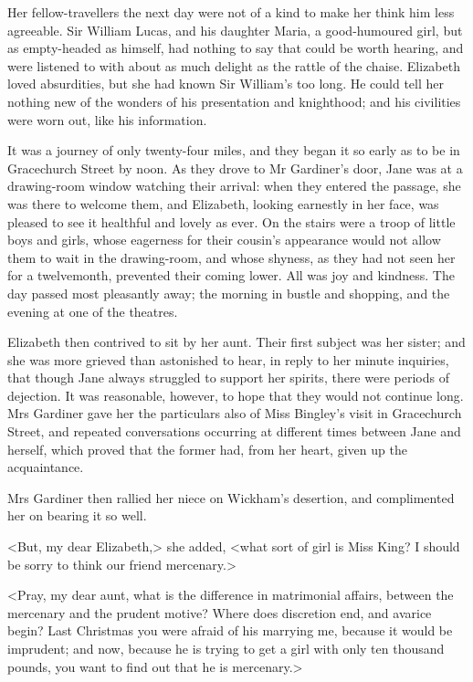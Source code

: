 Her fellow-travellers the next day were not of a kind to make her think him less agreeable. Sir William Lucas, and his daughter Maria, a good-humoured girl, but as empty-headed as himself, had nothing to say that could be worth hearing, and were listened to with about as much delight as the rattle of the chaise. Elizabeth loved absurdities, but she had known Sir William's too long. He could tell her nothing new of the wonders of his presentation and knighthood; and his civilities were worn out, like his information.

It was a journey of only twenty-four miles, and they began it so early as to be in Gracechurch Street by noon. As they drove to Mr Gardiner's door, Jane was at a drawing-room window watching their arrival: when they entered the passage, she was there to welcome them, and Elizabeth, looking earnestly in her face, was pleased to see it healthful and lovely as ever. On the stairs were a troop of little boys and girls, whose eagerness for their cousin's appearance would not allow them to wait in the drawing-room, and whose shyness, as they had not seen her for a twelvemonth, prevented their coming lower. All was joy and kindness. The day passed most pleasantly away; the morning in bustle and shopping, and the evening at one of the theatres.

Elizabeth then contrived to sit by her aunt. Their first subject was her sister; and she was more grieved than astonished to hear, in reply to her minute inquiries, that though Jane always struggled to support her spirits, there were periods of dejection. It was reasonable, however, to hope that they would not continue long. Mrs Gardiner gave her the particulars also of Miss Bingley's visit in Gracechurch Street, and repeated conversations occurring at different times between Jane and herself, which proved that the former had, from her heart, given up the acquaintance.

Mrs Gardiner then rallied her niece on Wickham's desertion, and complimented her on bearing it so well.

<But, my dear Elizabeth,> she added, <what sort of girl is Miss King? I should be sorry to think our friend mercenary.>

<Pray, my dear aunt, what is the difference in matrimonial affairs, between the mercenary and the prudent motive? Where does discretion end, and avarice begin? Last Christmas you were afraid of his marrying me, because it would be imprudent; and now, because he is trying to get a girl with only ten thousand pounds, you want to find out that he is mercenary.>

